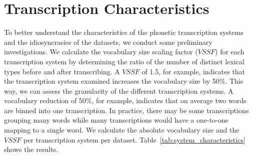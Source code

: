 \section{Transcription Characteristics}
To better understand the characteristics of the phonetic transcription systems and the idiosyncrasies of the datasets, we conduct some preliminary investigations.
We calculate the vocabulary size scaling factor ($VSSF$) for each transcription system by determining the ratio of the number of distinct lexical types before and after transcribing.
A $VSSF$ of 1.5, for example, indicates that the transcription system examined increases the vocabulary size by 50\%.
This way, we can assess the granularity of the different transcription systems.
A vocabulary reduction of 50\%, for example, indicates that on average two words are binned into one transcription.
In practice, there may be some transcriptions grouping many words while many transcriptions would have a one-to-one mapping to a single word.
We calculate the absolute vocabulary size and the $VSSF$ per transcription system per dataset.
Table~\ref{tab:system_characteristics} shows the results.\\
